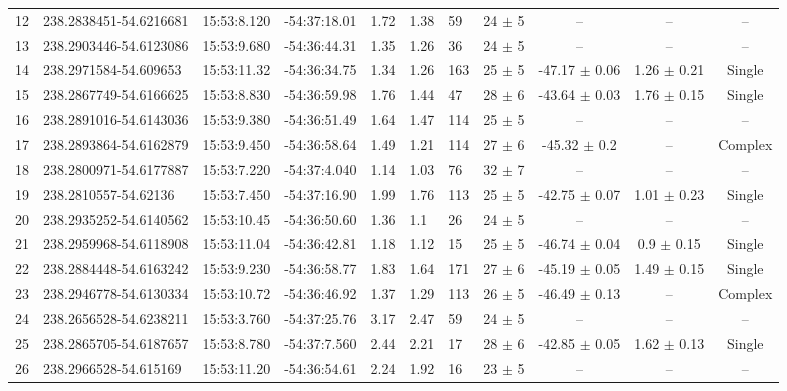 \begin{table}[htbp!]
\begin{tabular}{llllllllccc}
12  &  238.2838451-54.6216681  &  15:53:8.120  &  -54:37:18.01  &  1.72  &  1.38  &  59  &  24 $\pm$ 5  &  --  &  --  &  -- \\
13  &  238.2903446-54.6123086  &  15:53:9.680  &  -54:36:44.31  &  1.35  &  1.26  &  36  &  24 $\pm$ 5  &  --  &  --  &  -- \\
14  &  238.2971584-54.609653  &  15:53:11.32  &  -54:36:34.75  &  1.34  &  1.26  &  163  &  25 $\pm$ 5  &  -47.17 $\pm$ 0.06  &  1.26 $\pm$ 0.21  &  Single \\
15  &  238.2867749-54.6166625  &  15:53:8.830  &  -54:36:59.98  &  1.76  &  1.44  &  47  &  28 $\pm$ 6  &  -43.64 $\pm$ 0.03  &  1.76 $\pm$ 0.15  &  Single \\
16  &  238.2891016-54.6143036  &  15:53:9.380  &  -54:36:51.49  &  1.64  &  1.47  &  114  &  25 $\pm$ 5  &  --  &  --  &  -- \\
17  &  238.2893864-54.6162879  &  15:53:9.450  &  -54:36:58.64  &  1.49  &  1.21  &  114  &  27 $\pm$ 6  &  -45.32 $\pm$ 0.2  &  --  &  Complex \\
18  &  238.2800971-54.6177887  &  15:53:7.220  &  -54:37:4.040  &  1.14  &  1.03  &  76  &  32 $\pm$ 7  &  --  &  --  &  -- \\
19  &  238.2810557-54.62136  &  15:53:7.450  &  -54:37:16.90  &  1.99  &  1.76  &  113  &  25 $\pm$ 5  &  -42.75 $\pm$ 0.07  &  1.01 $\pm$ 0.23  &  Single \\
20  &  238.2935252-54.6140562  &  15:53:10.45  &  -54:36:50.60  &  1.36  &  1.1  &  26  &  24 $\pm$ 5  &  --  &  --  &  -- \\
21  &  238.2959968-54.6118908  &  15:53:11.04  &  -54:36:42.81  &  1.18  &  1.12  &  15  &  25 $\pm$ 5  &  -46.74 $\pm$ 0.04  &  0.9 $\pm$ 0.15  &  Single \\
22  &  238.2884448-54.6163242  &  15:53:9.230  &  -54:36:58.77  &  1.83  &  1.64  &  171  &  27 $\pm$ 6  &  -45.19 $\pm$ 0.05  &  1.49 $\pm$ 0.15  &  Single \\
23  &  238.2946778-54.6130334  &  15:53:10.72  &  -54:36:46.92  &  1.37  &  1.29  &  113  &  26 $\pm$ 5  &  -46.49 $\pm$ 0.13  &  --  &  Complex \\
24  &  238.2656528-54.6238211  &  15:53:3.760  &  -54:37:25.76  &  3.17  &  2.47  &  59  &  24 $\pm$ 5  &  --  &  --  &  -- \\
25  &  238.2865705-54.6187657  &  15:53:8.780  &  -54:37:7.560  &  2.44  &  2.21  &  17  &  28 $\pm$ 6  &  -42.85 $\pm$ 0.05  &  1.62 $\pm$ 0.13  &  Single \\
26  &  238.2966528-54.615169  &  15:53:11.20  &  -54:36:54.61  &  2.24  &  1.92  &  16  &  23 $\pm$ 5  &  --  &  --  &  -- \\

\end{tabular}
\end{table}
